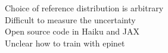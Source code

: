 \documentclass[preview]{standalone}
\begin{document}
Choice of reference distribution is arbitrary\\Difficult to measure the uncertainty\\Open source code in Haiku and JAX\\Unclear how to train with epinet\\
\end{document}

